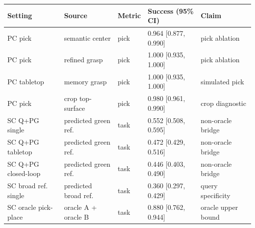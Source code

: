 \begin{tabular}{lllll}
\toprule
Setting & Source & Metric & Success (95\% CI) & Claim \\
\midrule
PC pick & semantic center & pick & 0.964 [0.877, 0.990] & pick ablation \\
PC pick & refined grasp & pick & 1.000 [0.935, 1.000] & pick ablation \\
PC tabletop & memory grasp & pick & 1.000 [0.935, 1.000] & simulated pick \\
PC pick & crop top-surface & pick & 0.980 [0.961, 0.990] & crop diagnostic \\
SC Q+PG single & predicted green ref. & task & 0.552 [0.508, 0.595] & non-oracle bridge \\
SC Q+PG tabletop & predicted green ref. & task & 0.472 [0.429, 0.516] & non-oracle bridge \\
SC Q+PG closed-loop & predicted green ref. & task & 0.446 [0.403, 0.490] & non-oracle bridge \\
SC broad ref. single & predicted broad ref. & task & 0.360 [0.297, 0.429] & query specificity \\
SC oracle pick-place & oracle A + oracle B & task & 0.880 [0.762, 0.944] & oracle upper bound \\
\bottomrule
\end{tabular}
